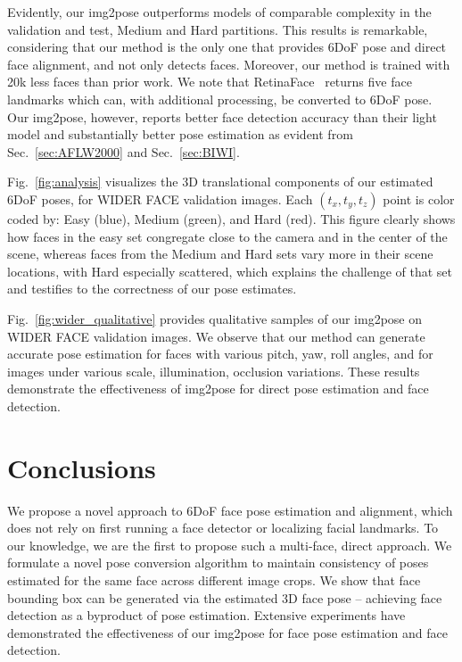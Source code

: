 \documentclass[final]{cvpr}
\begin{document}
Evidently, our img2pose outperforms models of comparable complexity in the validation and test,  Medium and Hard partitions. This results is remarkable, considering that our method is the only one that provides 6DoF pose and direct face alignment, and not only detects faces. Moreover, our method is trained with 20k less faces than prior work. We note that RetinaFace~\cite{retinaface} returns five face landmarks which can, with additional processing, be converted to 6DoF pose. Our img2pose, however, reports better face detection accuracy than their light model and substantially better pose estimation as evident from Sec.~\ref{sec:AFLW2000} and Sec.~\ref{sec:BIWI}.

Fig.~\ref{fig:analysis} visualizes the 3D translational components of our estimated 6DoF poses, for WIDER FACE validation images. Each $(t_x,t_y,t_z)$ point is color coded by: Easy (blue), Medium (green), and Hard (red). This figure clearly shows how faces in the easy set congregate close to the camera and in the center of the scene, whereas faces from the Medium and Hard sets vary more in their scene locations, with Hard especially scattered, which explains the challenge of that set and testifies to the correctness of our pose estimates. 


Fig.~\ref{fig:wider_qualitative} provides qualitative samples of our img2pose on WIDER FACE validation images. We observe that our method can generate accurate pose estimation for faces with various pitch, yaw, roll angles, and for images under various scale, illumination, occlusion variations. These results demonstrate the effectiveness of img2pose for direct pose estimation and face detection.


\section{Conclusions}
We propose a novel approach to 6DoF face pose estimation and alignment, which does not rely on first running a face detector or localizing facial landmarks. To our knowledge, we are the first to propose such a multi-face, direct approach. We formulate a novel pose conversion algorithm to maintain consistency of poses estimated for the same face across different image crops. We show that face bounding box can be generated via the estimated 3D face pose -- achieving face detection as a byproduct of pose estimation. Extensive experiments have demonstrated the effectiveness of our img2pose for face pose estimation and face detection. 
\end{document}
